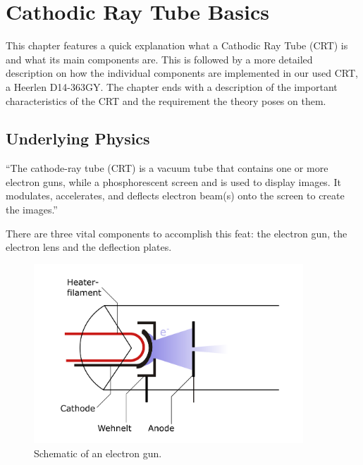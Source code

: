 
\chapter{Cathodic Ray Tube Basics}
\label{ch:Cathodic Ray Tube Basics}

This chapter features a quick explanation what a Cathodic Ray Tube (CRT) is and what its main components are. This is followed by a more detailed description on how the individual components are implemented in our used CRT, a Heerlen D14-363GY. The chapter ends with a description of the important characteristics of the CRT and the requirement the theory poses on them.

\section{Underlying Physics}


``The cathode-ray tube (CRT) is a vacuum tube that contains one or more electron guns, while a phosphorescent screen and is used to display images. It modulates, accelerates, and deflects electron beam(s) onto the screen to create the images.''\cite{2021}


There are three vital components to accomplish this feat: the electron gun, the electron lens and the deflection plates.

\begin{figure}
	\centering
	\includegraphics[width=0.9\textwidth]{Chapters/CRT-Basics/electron_gun}
	\caption{Schematic of an electron gun.}
	\label{fig:electrongun}
\end{figure}

